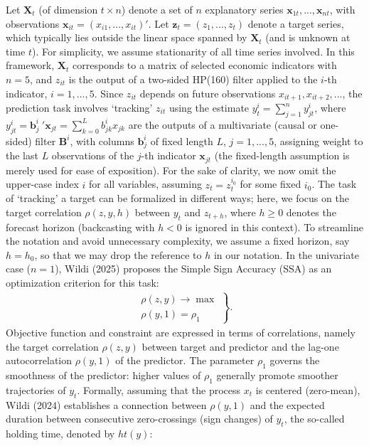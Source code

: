 \documentclass[a4paper]{article}
\begin{document}
Let $\mathbf{X}_t$ (of dimension $t\times n$) denote a set of $n$ explanatory series $\mathbf{x}_{1t},...,\mathbf{x}_{nt}$, with observations $\mathbf{x}_{it}=(x_{i1},...,x_{it})'$. Let $\mathbf{z}_t=(z_{1},...,z_t)$  denote a target series, which typically lies outside the linear space spanned by $\mathbf{X}_t$  (and is unknown at time $t$). For simplicity, we assume stationarity of all time series involved. In this framework, $\mathbf{X}_t$ corresponds to a matrix of selected economic indicators with $n=5$, and $z_{it}$   is the output of a two-sided HP(160) filter applied to the $i$-th indicator, $i=1,...,5$. Since $z_{it}$  depends on future observations $x_{it+1},x_{it+2},...$, the prediction task involves `tracking' $z_{it}$  using the estimate $y^i_{t}=\sum_{j=1}^ny^i_{jt}$, where $y^i_{jt}=\mathbf{b}^i_j~'\mathbf{x}_{jt}=\sum_{k=0}^{L} b^i_{jk}x_{jk}$ are the outputs of a multivariate (causal or one-sided) filter $\mathbf{B}^i$, with columns $\mathbf{b}^i_{j}$ of fixed length $L$, $j=1,...,5$, assigning weight to the last $L$ observations of the $j$-th indicator $\mathbf{x}_{jt}$ (the fixed-length assumption is merely used for ease of exposition).
For the sake of clarity, we now omit the upper-case index  $i$ for all variables, assuming $z_t=z^{i_0}_{t}$ for some fixed $i_0$.%
The task of `tracking'  a target can be formalized in different ways; here, we focus on the target correlation $\rho(z,y,h)$ between $y_t$ and $z_{t+h}$, where $h\geq 0$ denotes the forecast horizon (backcasting with $h<0$ is ignored in this context). To streamline the notation and avoid unnecessary complexity, we assume a fixed horizon, say $h=h_0$, so that we may drop the reference to $h$ in our notation. In the univariate case ($n=1$), Wildi (2025) proposes the Simple Sign Accuracy (SSA) as an optimization criterion for this task:
\begin{eqnarray}\label{critssa}
\left.\begin{array}{c}\rho(z,y)\to\max\\
\rho(y,1)=\rho_1\end{array}\right\}.
\end{eqnarray}
Objective function and constraint are expressed in terms of correlations, namely the target correlation $\rho(z,y)$ between target and predictor and the lag-one autocorrelation $\rho(y,1)$ of the predictor. The parameter $\rho_1$ governs the smoothness of the predictor: higher values of $\rho_1$ generally promote smoother trajectories of $y_t$. Formally, assuming that the process $x_t$ is centered (zero-mean), Wildi (2024) establishes a connection between $\rho(y,1)$ and the expected duration between consecutive zero-crossings (sign changes) of $y_t$, the so-called holding time, denoted by $ht(y)$:
\end{document}
